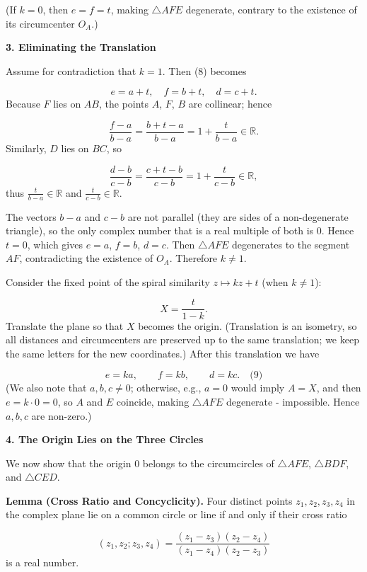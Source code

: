 \documentclass{llmxive}
\providecommand{\solutionheading}[1]{\par\smallskip\noindent\textbf{#1}\par}
\begin{document}
(If \(k=0\), then \(e=f=t\), making \(\triangle AFE\) degenerate, contrary to the existence of its circumcenter \(O_A\).)\par
\smallskip
\solutionheading{3. Eliminating the Translation}
Assume for contradiction that \(k = 1\). Then (8) becomes\par
\[
e = a + t,\quad f = b + t,\quad d = c + t.
\]
Because \(F\) lies on \(AB\), the points \(A\), \(F\), \(B\) are collinear; hence\par
\[
\frac{f - a}{b - a} = \frac{b + t - a}{b - a} = 1 + \frac{t}{b-a} \in \mathbb{R}.
\]
Similarly, \(D\) lies on \(BC\), so\par
\[
\frac{d - b}{c - b} = \frac{c + t - b}{c - b} = 1 + \frac{t}{c-b} \in \mathbb{R},
\]
thus \(\frac{t}{b-a} \in \mathbb{R}\) and \(\frac{t}{c-b} \in \mathbb{R}\).\par
The vectors \(b-a\) and \(c-b\) are not parallel (they are sides of a non-degenerate triangle), so the only complex number that is a real multiple of both is \(0\). Hence \(t = 0\), which gives \(e = a\), \(f = b\), \(d = c\). Then \(\triangle AFE\) degenerates to the segment \(AF\), contradicting the existence of \(O_A\). Therefore \(k \neq 1\).\par
Consider the fixed point of the spiral similarity \(z \mapsto kz + t\) (when \(k \neq 1\)):\par
\[
X = \frac{t}{1 - k}.
\]
Translate the plane so that \(X\) becomes the origin. (Translation is an isometry, so all distances and circumcenters are preserved up to the same translation; we keep the same letters for the new coordinates.) After this translation we have\par
\[
e = k a,\qquad f = k b,\qquad d = k c. \quad\text{(9)}
\]
(We also note that \(a,b,c \neq 0\); otherwise, e.g., \(a = 0\) would imply \(A = X\), and then \(e = k \cdot 0 = 0\), so \(A\) and \(E\) coincide, making \(\triangle AFE\) degenerate - impossible. Hence \(a,b,c\) are non-zero.)\par
\smallskip
\solutionheading{4. The Origin Lies on the Three Circles}
We now show that the origin \(0\) belongs to the circumcircles of \(\triangle AFE\), \(\triangle BDF\), and \(\triangle CED\).\par
\textbf{Lemma (Cross Ratio and Concyclicity).} Four distinct points \(z_1,z_2,z_3,z_4\) in the complex plane lie on a common circle or line if and only if their cross ratio\par
\[
(z_1,z_2;z_3,z_4) = \frac{(z_1 - z_3)(z_2 - z_4)}{(z_1 - z_4)(z_2 - z_3)}
\]
is a real number.\par
\end{document}
